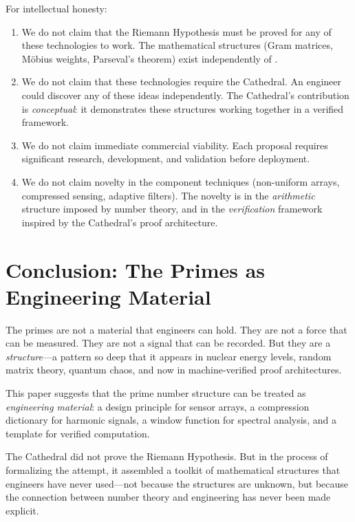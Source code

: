 \documentclass[11pt,a4paper]{article}
\begin{document}
For intellectual honesty:

\begin{enumerate}
  \item We do not claim that the Riemann Hypothesis must be proved
    for any of these technologies to work. The mathematical
    structures (Gram matrices, M\"obius weights, Parseval's theorem)
    exist independently of \RH.
  \item We do not claim that these technologies require the
    Cathedral. An engineer could discover any of these ideas
    independently. The Cathedral's contribution is
    \emph{conceptual}: it demonstrates these structures working
    together in a verified framework.
  \item We do not claim immediate commercial viability. Each
    proposal requires significant research, development, and
    validation before deployment.
  \item We do not claim novelty in the component techniques
    (non-uniform arrays, compressed sensing, adaptive filters).
    The novelty is in the \emph{arithmetic} structure imposed by
    number theory, and in the \emph{verification} framework
    inspired by the Cathedral's proof architecture.
\end{enumerate}

\section{Conclusion: The Primes as Engineering Material}

The primes are not a material that engineers can hold. They are not
a force that can be measured. They are not a signal that can be
recorded. But they are a \emph{structure}---a pattern so deep that
it appears in nuclear energy levels, random matrix theory, quantum
chaos, and now in machine-verified proof architectures.

This paper suggests that the prime number structure can be treated
as \emph{engineering material}: a design principle for sensor
arrays, a compression dictionary for harmonic signals, a window
function for spectral analysis, and a template for verified
computation.

The Cathedral did not prove the Riemann Hypothesis. But in the
process of formalizing the attempt, it assembled a toolkit of
mathematical structures that engineers have never used---not
because the structures are unknown, but because the connection
between number theory and engineering has never been made explicit.
\end{document}
